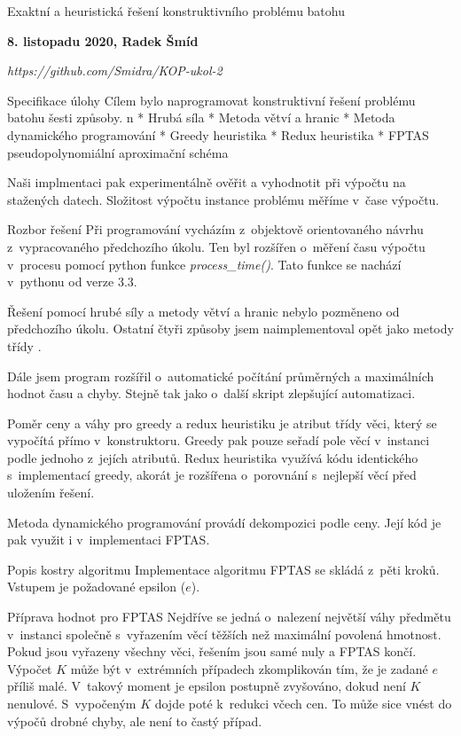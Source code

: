 

\tit Exaktní a heuristická řešení konstruktivního problému batohu
\centerline{\bf 8. listopadu 2020, Radek Šmíd}
\medskip
\centerline{\it https://github.com/Smidra/KOP-ukol-2}


\sec Specifikace úlohy
Cílem bylo naprogramovat konstruktivní řešení problému batohu šesti způsoby.
\begitems\style n
* Hrubá síla
* Metoda větví a hranic
* Metoda dynamického programování
* Greedy heuristika
* Redux heuristika
* FPTAS pseudopolynomiální aproximační schéma
\enditems

Naši implmentaci pak experimentálně ověřit a vyhodnotit při výpočtu na stažených datech. Složitost výpočtu instance problému měříme v~čase výpočtu.




\sec Rozbor řešení
Při programování vycházím z~objektově orientovaného návrhu z~vypracovaného předchozího úkolu. Ten byl rozšířen o~měření času výpočtu v~procesu pomocí python funkce {\it process\_time()}. Tato funkce se nachází v~pythonu od verze 3.3.

Řešení pomocí hrubé síly a metody větví a hranic nebylo pozměneno od předchozího úkolu. Ostatní čtyři způsoby jsem naimplementoval opět jako metody třídy .

Dále jsem program rozšířil o~automatické počítání průměrných a maximálních hodnot času a chyby. Stejně tak jako o~další skript zlepšující automatizaci.

Poměr ceny a váhy pro greedy a redux heuristiku je atribut třídy věci, který se vypočítá přímo v~konstruktoru. Greedy pak pouze seřadí pole věcí v~instanci podle jednoho z~jejích atributů. Redux heuristika využívá kódu identického s~implementací greedy, akorát je rozšířena o~porovnání s~nejlepší věcí před uložením řešení.

Metoda dynamického programování provádí dekompozici podle ceny. Její kód je pak využit i v~implementaci FPTAS.


\sec Popis kostry algoritmu
Implementace algoritmu FPTAS se skládá z~pěti kroků. Vstupem je požadované epsilon ($e$).

\secc Příprava hodnot pro FPTAS
Nejdříve se jedná o~nalezení největší váhy předmětu v~instanci společně s~vyřazením věcí těžších než maximální povolená hmotnost. Pokud jsou vyřazeny všechny věci, řešením jsou samé nuly a FPTAS končí. Výpočet $K$ může být v~extrémních případech  zkomplikován tím, že je zadané $e$ příliš malé. V~takový moment je epsilon postupně zvyšováno, dokud není $K$ nenulové. S~vypočeným $K$ dojde poté k~redukci včech cen. To může sice vnést do výpočů drobné chyby, ale není to častý případ.

